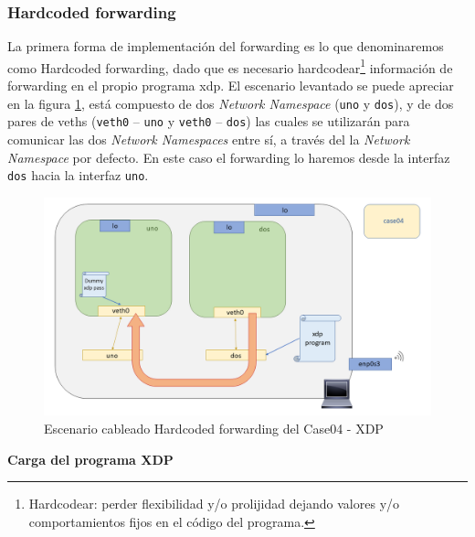 
\subsubsection{Hardcoded forwarding}
\label{xdp_ether_case04_hard}

La primera forma de implementación del forwarding es lo que denominaremos como Hardcoded forwarding, dado que es necesario hardcodear\footnote{Hardcodear: perder flexibilidad y/o prolijidad dejando valores y/o comportamientos fijos en el código del programa.} información de forwarding en el propio programa \gls{xdp}. El escenario levantado se puede apreciar en la figura \ref{fig:case04_xdp_ether_scenario1}, está compuesto de dos \textit{Network Namespace} (\texttt{uno} y \texttt{dos}), y de dos pares de \gls{veth}s (\texttt{veth0} -- \texttt{uno} y \texttt{veth0} -- \texttt{dos}) las cuales se utilizarán para comunicar las dos \textit{Network Namespaces} entre sí, a través del la \textit{Network Namespace} por defecto. En este caso el forwarding lo haremos desde la interfaz \texttt{dos} hacia la interfaz \texttt{uno}.


\begin{figure}[ht]
    \centering
    \includegraphics[width=16cm]{archivos/img/dev/xdp/case04/scenario_01.png}
    \caption{Escenario cableado Hardcoded forwarding del Case04 - XDP}
    \label{fig:case04_xdp_ether_scenario1}
\end{figure}


\vspace{0.5cm}
\textbf{Carga del programa XDP}\\
\par


